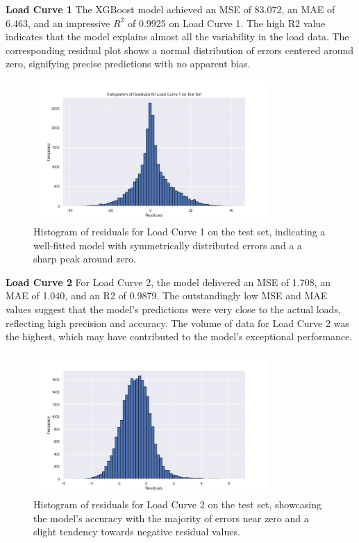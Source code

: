 \documentclass{article} %
\begin{document}
\textbf{Load Curve 1}
The XGBoost model achieved an \gls{MSE} of 83.072, an \gls{MAE} of 6.463, and an impressive $R^2$ of 0.9925 on Load Curve 1. The high \gls{R2} value indicates that the model explains almost all the variability in the load data. The corresponding residual plot shows a normal distribution of errors centered around zero, signifying precise predictions with no apparent bias.
\begin{figure}[H]
\centering
\includegraphics[width=0.8\textwidth]{ressources/residuals/erg/lc1/residuals.jpg}
\caption{Histogram of residuals for Load Curve 1 on the test set, indicating a well-fitted model with symmetrically distributed errors and a a sharp peak around zero.}
\label{fig:residuals_curve1}
\end{figure}

\textbf{Load Curve 2}
For Load Curve 2, the model delivered an \gls{MSE} of 1.708, an \gls{MAE} of 1.040, and an \gls{R2} of 0.9879. The outstandingly low \gls{MSE} and \gls{MAE} values suggest that the model's predictions were very close to the actual loads, reflecting high precision and accuracy. The volume of data for Load Curve 2 was the highest, which may have contributed to the model's exceptional performance.
\begin{figure}[H]
\centering
\includegraphics[width=0.8\textwidth]{ressources/residuals/erg/lc2/residuals.jpg}
\caption{Histogram of residuals for Load Curve 2 on the test set, showcasing the model's accuracy with the majority of errors near zero and a slight tendency towards negative residual values.}
\label{fig:residuals_curve2}
\end{figure}
\end{document}
